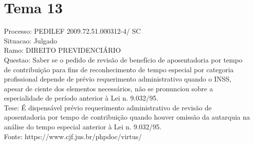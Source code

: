\documentclass[12pt]{article}
\begin{document}
\section*{Tema 13}
Processo: PEDILEF 2009.72.51.000312-4/ SC\\
Situacao: Julgado\\
Ramo: DIREITO PREVIDENCIÁRIO\\
Questao: Saber se o pedido de revisão de benefício de aposentadoria por tempo de contribuição para fins de reconhecimento de tempo especial por categoria profissional depende de prévio requerimento administrativo quando o INSS, apesar de ciente dos elementos necessários, não se pronunciou sobre a especialidade de período anterior à Lei n. 9.032/95.\\
Tese: É dispensável prévio requerimento administrativo de revisão de aposentadoria por tempo de contribuição quando houver omissão da autarquia na análise do tempo especial anterior à Lei n. 9.032/95.\\
Fonte: https://www.cjf.jus.br/phpdoc/virtus/
\end{document}
